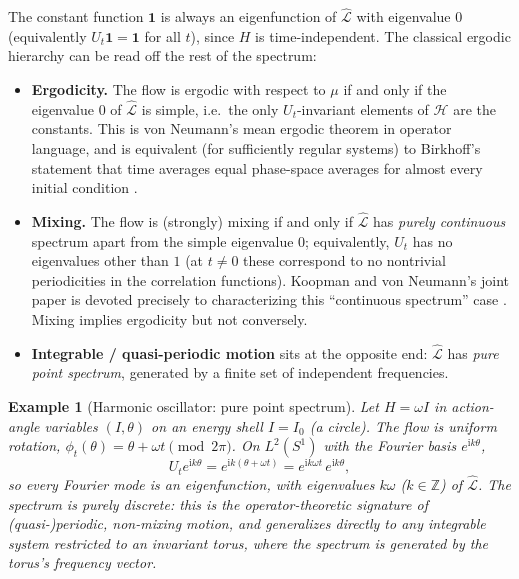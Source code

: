 \documentclass[11pt]{article}
\newtheorem{example}[proposition]{Example}
\theoremstyle{remark}
\newcommand{\CL}{\widehat{\mathcal{L}}}
\newcommand{\ii}{\mathrm{i}}
\begin{document}
The constant function $\mathbf 1$ is always an eigenfunction of $\CL$ with eigenvalue $0$ (equivalently $U_t\mathbf 1=\mathbf 1$ for all $t$), since $H$ is time-independent. The classical ergodic hierarchy can be read off the rest of the spectrum:

\begin{itemize}
\item \textbf{Ergodicity.} The flow is ergodic with respect to $\mu$ if and only if the eigenvalue $0$ of $\CL$ is simple, i.e.\ the only $U_t$-invariant elements of $\mathcal H$ are the constants. This is von Neumann's mean ergodic theorem in operator language, and is equivalent (for sufficiently regular systems) to Birkhoff's statement that time averages equal phase-space averages for almost every initial condition \cite{Birkhoff1931}.
\item \textbf{Mixing.} The flow is (strongly) mixing if and only if $\CL$ has \emph{purely continuous} spectrum apart from the simple eigenvalue $0$; equivalently, $U_t$ has no eigenvalues other than $1$ (at $t\ne 0$ these correspond to no nontrivial periodicities in the correlation functions). Koopman and von Neumann's joint paper is devoted precisely to characterizing this ``continuous spectrum'' case \cite{KoopmanVonNeumann1932}. Mixing implies ergodicity but not conversely.
\item \textbf{Integrable / quasi-periodic motion} sits at the opposite end: $\CL$ has \emph{pure point spectrum}, generated by a finite set of independent frequencies.
\end{itemize}

\begin{example}[Harmonic oscillator: pure point spectrum]
Let $H=\omega I$ in action-angle variables $(I,\theta)$ on an energy shell $I=I_0$ (a circle). The flow is uniform rotation, $\phi_t(\theta)=\theta+\omega t \pmod {2\pi}$. On $L^2(S^1)$ with the Fourier basis $e^{\ii k\theta}$,
\begin{equation}
U_t e^{\ii k\theta} = e^{\ii k(\theta+\omega t)} = e^{\ii k\omega t}\,e^{\ii k\theta},
\end{equation}
so every Fourier mode is an eigenfunction, with eigenvalues $k\omega$ ($k\in\mathbb Z$) of $\CL$. The spectrum is purely discrete: this is the operator-theoretic signature of (quasi-)periodic, non-mixing motion, and generalizes directly to any integrable system restricted to an invariant torus, where the spectrum is generated by the torus's frequency vector.
\end{example}
\end{document}
